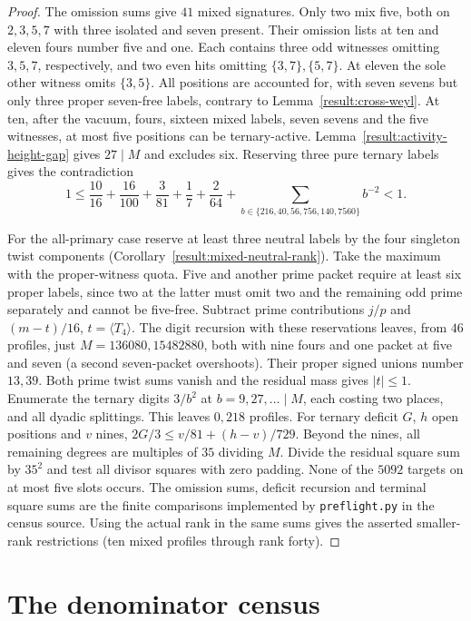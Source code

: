 \documentclass[11pt]{amsart}
\numberwithin{equation}{section}
\theoremstyle{definition}
\theoremstyle{plain}
\begin{document}
\begin{proof}
The omission sums give $41$ mixed signatures. Only two mix five, both
on $2,3,5,7$ with three isolated and seven present. Their omission
lists at ten and eleven fours number five and one. Each contains three
odd witnesses omitting $3,5,7$, respectively, and two even hits
omitting $\{3,7\},\{5,7\}$. At eleven the sole other witness omits
$\{3,5\}$. All positions are accounted for, with seven sevens but only
three proper seven-free labels, contrary to Lemma~\ref{result:cross-weyl}.
At ten, after the vacuum, fours, sixteen mixed labels, seven sevens and
the five witnesses, at most five positions can be ternary-active.
Lemma~\ref{result:activity-height-gap} gives $27\mid M$ and excludes
six. Reserving three pure ternary labels gives the contradiction
\[
 1\le\frac{10}{16}+\frac{16}{100}+\frac3{81}+\frac17+\frac2{64}
 +\sum_{b\in\{216,40,56,756,140,7560\}} b^{-2}<1.
\]

For the all-primary case reserve at least three neutral labels by the
four singleton twist components (Corollary~\ref{result:mixed-neutral-rank}).
Take the maximum with the proper-witness quota. Five and another prime
packet require at least six proper labels, since two at the latter
must omit two and the remaining odd prime separately and cannot be
five-free. Subtract prime contributions $j/p$ and $(m-t)/16$,
$t=\langle T_4\rangle$. The digit recursion with these reservations
leaves, from $46$ profiles, just $M=136080,15482880$, both with nine
fours and one packet at five and seven (a second seven-packet
overshoots). Their proper signed unions number $13,39$. Both prime
twist sums vanish and the residual mass gives $|t|\le1$. Enumerate
the ternary digits $3/b^2$ at $b=9,27,\ldots\mid M$, each costing
two places, and all dyadic splittings. This leaves $0,218$ profiles.
For ternary deficit $G$, $h$ open positions and $v$ nines,
$2G/3\le v/81+(h-v)/729$. Beyond the nines, all remaining degrees
are multiples of $35$ dividing $M$. Divide the residual square sum
by $35^2$ and test all divisor squares with zero padding. None of the
$5092$ targets on at most five slots occurs. The omission sums,
deficit recursion and terminal square sums are the finite comparisons
implemented by \texttt{preflight.py} in the census source.
Using the actual rank in the same sums gives the asserted smaller-rank
restrictions (ten mixed profiles through rank forty).
\end{proof}

\section{The denominator census}\label{sec:verify}
\end{document}

